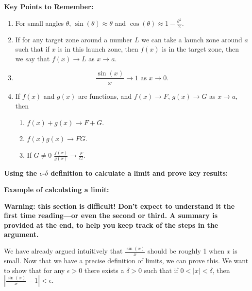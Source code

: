 \documentclass{article}
\begin{document}
\clearpage


{\bf Key Points to Remember:}

\vspace{5mm}

\begin{enumerate}
\item For small angles $\theta$, $\sin(\theta)\approx \theta$ and $\cos(\theta)\approx 1-\frac{\theta^2}{2}$.
\item If for any target zone around a number $L$ we can take a launch zone around $a$ such that if $x$ is in this launch zone, then $f(x)$ is in the target zone, then we say that $f(x)\to L$ as $x\to a$.
\item \[\frac{\sin(x)}{x}\to 1 \mbox{ as } x\to 0.\]
\item If $f(x)$ and $g(x)$ are functions, and $f(x)\to F$, $g(x)\to G$ as $x\to a$, then
	\begin{enumerate}
		\item $f(x)+g(x)\to F+G$.
		\item $f(x)g(x)\to FG$.
		\item If $G\neq 0$ $\frac{f(x)}{g(x)}\to \frac{F}{G}$.
	\end{enumerate}
\end{enumerate}




\clearpage









\textbf{\LARGE Using the $\epsilon$-$\delta$ definition to calculate a limit and prove key results:}\bigskip






\textbf{Example of calculating a limit:}

\vspace{5mm}

\textbf{Warning: this section is difficult! Don't expect to understand it the first time reading---or even the second or third. A summary is provided at the end, to help you keep track of the steps in the argument.}

\vspace{5mm}


We have already argued intuitively that $\frac{\sin(x)}{x}$ should be roughly 1 when $x$ is small. Now that we have a precise definition of limits, we can prove this. We want to show that for any $\epsilon>0$ there exists a $\delta>0$ such that if $0<|x|<\delta$, then $\left|\frac{\sin(x)}{x}-1\right|<\epsilon$. 
\end{document}
